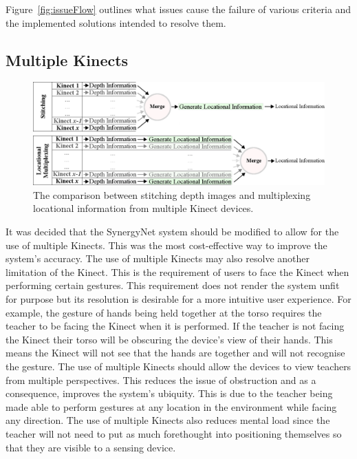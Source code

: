 \documentclass[manuscript, review, screen]{acmart}
\begin{document}
Figure~\ref{fig:issueFlow} outlines what issues cause the failure of various criteria and the implemented solutions intended to resolve them.

\subsection{Multiple Kinects}  

\begin{figure}[t]
  \centering
  \includegraphics[width=1\textwidth]{figures/multiplexing_flow_diagram.png}
  \caption{The comparison between stitching depth images and multiplexing locational information from multiple Kinect devices.}
  \label{fig:multiplexing}
\end{figure}

It was decided that the SynergyNet system should be modified to allow for the use of multiple Kinects.
This was the most cost-effective way to improve the system's accuracy.
The use of multiple Kinects may also resolve another limitation of the Kinect.
This is the requirement of users to face the Kinect when performing certain gestures.
This requirement does not render the system unfit for purpose but its resolution is desirable for a more intuitive user experience.
For example, the gesture of hands being held together at the torso requires the teacher to be facing the Kinect when it is performed.
If the teacher is not facing the Kinect their torso will be obscuring the device's view of their hands.
This means the Kinect will not see that the hands are together and will not recognise the gesture.
The use of multiple Kinects should allow the devices to view teachers from multiple perspectives.
This reduces the issue of obstruction and as a consequence, improves the system's ubiquity.
This is due to the teacher being made able to perform gestures at any location in the environment while facing any direction.
The use of multiple Kinects also reduces mental load since the teacher will not need to put as much forethought into positioning themselves so that they are visible to a sensing device.
\end{document}
